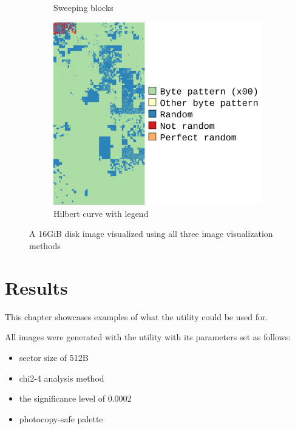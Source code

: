 \documentclass[
  digital, %
  color,   %
  oneside, %
  lof,     %
  nolot,     %
]{fithesis4}
\begin{document}
\begin{figure}
\begin{subfigure}[t]{.45\textwidth}
        \caption{Sweeping blocks}
        \label{fig:impl-sweeping-blocks}
    \end{subfigure}
    \begin{subfigure}[t]{.6\textwidth}
        \centering
        \includegraphics[width=\textwidth,interpolate=false]{pv204_fde-chi2-4-hilbert.png}
        \caption{Hilbert curve with legend}
        \label{fig:impl-hilbert-curve}
    \end{subfigure}
    \caption{A 16GiB disk image visualized using all three image visualization methods}
    \label{fig:impl-visualizations}
\end{figure}

\chapter{Results}
\label{chap:results}
This chapter showcases examples of what the utility could be used for.

All images were generated with the utility with its parameters set as follows:
\begin{itemize}
  \item sector size of 512B
  \item chi2-4 analysis method
  \item the significance level of 0.0002
  \item photocopy-safe palette
\end{itemize}
\end{document}
